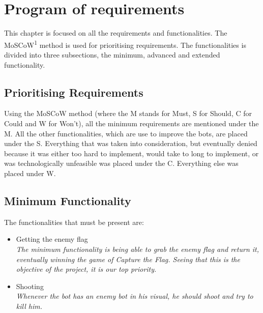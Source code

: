 \chapter{Program of requirements}
This chapter is focused on all the requirements and functionalities. The MoSCoW\textsuperscript{1} method is used for prioritising requirements. The functionalities is divided into three subsections, the minimum, advanced and extended functionality. 
\section{Prioritising Requirements}
Using the MoSCoW method (where the M stands for Must, S for Should, C for Could and W for Won't), all the minimum requirements are mentioned under the M. All the other functionalities, which are use to improve the bots, are placed under the S. Everything that was taken into consideration, but eventually denied because it was either too hard to implement, would take to long to implement, or was technologically unfeasible was placed under the C. Everything else was placed under W.\\


\section{Minimum Functionality}
The functionalities that must be present are:
\begin{itemize}
	\item Getting the enemy flag \\
		\textit{The minimum functionality is being able to grab the enemy flag and return it, eventually winning the game of Capture the Flag. Seeing that this is the objective of the project, it is our top priority.}
	\item Shooting \\
		\textit{Whenever the bot has an enemy bot in his visual, he should shoot and try to kill him.}
\end{itemize}

